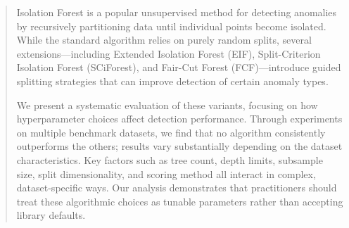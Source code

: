 \begin{abstract}

Isolation Forest is a popular unsupervised method for detecting anomalies by recursively partitioning data until individual points become isolated. While the standard algorithm relies on purely random splits, several extensions---including Extended Isolation Forest (EIF), Split-Criterion Isolation Forest (SCiForest), and Fair-Cut Forest (FCF)---introduce guided splitting strategies that can improve detection of certain anomaly types.

We present a systematic evaluation of these variants, focusing on how hyperparameter choices affect detection performance. Through experiments on multiple benchmark datasets, we find that no algorithm consistently outperforms the others; results vary substantially depending on the dataset characteristics. Key factors such as tree count, depth limits, subsample size, split dimensionality, and scoring method all interact in complex, dataset-specific ways. Our analysis demonstrates that practitioners should treat these algorithmic choices as tunable parameters rather than accepting library defaults.

\end{abstract}
